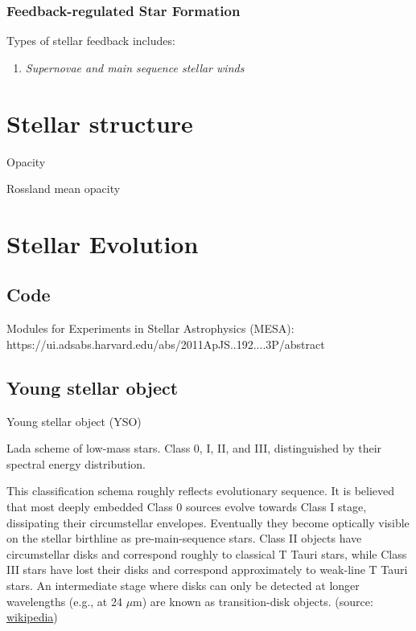 \subsubsection{Feedback-regulated Star Formation}
\label{sec:orge5a3e4b}
Types of stellar feedback includes:

\begin{enumerate}
\item \emph{Supernovae and main sequence stellar winds}
\end{enumerate}

\section{Stellar structure}

Opacity

Rossland mean opacity


\section{Stellar Evolution}
\label{sec:orgb338101}

\subsection{Code}

Modules for Experiments in Stellar Astrophysics (MESA): https://ui.adsabs.harvard.edu/abs/2011ApJS..192....3P/abstract 

\subsection{Young stellar object}
\label{sec:org7d97720}

Young stellar object (YSO)


Lada scheme of low-mass stars. Class 0, I, II, and III, distinguished by their spectral energy distribution.

This classification schema roughly reflects evolutionary sequence. It is believed that most deeply embedded Class 0 sources evolve towards Class I stage, dissipating their circumstellar envelopes. Eventually they become optically visible on the stellar birthline as pre-main-sequence stars. Class II objects have circumstellar disks and correspond roughly to classical T Tauri stars, while Class III stars have lost their disks and correspond approximately to weak-line T Tauri stars. An intermediate stage where disks can only be detected at longer wavelengths (e.g., at 24 $\mu$m) are known as transition-disk objects. (source: \href{https://en.wikipedia.org/wiki/Young\_stellar\_object}{wikipedia})

